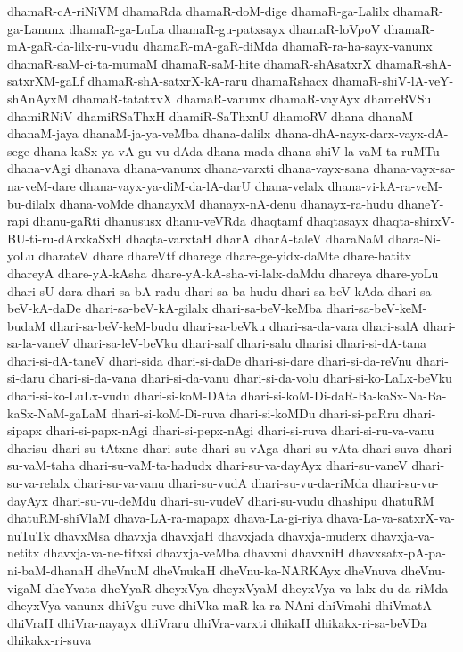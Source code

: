 {dhamaR-cA-riNiVM
dhamaRda
dhamaR-doM-dige
dhamaR-ga-Lalilx
dhamaR-ga-Lanunx
dhamaR-ga-LuLa
dhamaR-gu-patxsayx
dhamaR-loVpoV
dhamaR-mA-gaR-da-lilx-ru-vudu
dhamaR-mA-gaR-diMda
dhamaR-ra-ha-sayx-vanunx
dhamaR-saM-ci-ta-mumaM
dhamaR-saM-hite
dhamaR-shAsatxrX
dhamaR-shA-satxrXM-gaLf
dhamaR-shA-satxrX-kA-raru
dhamaRshacx
dhamaR-shiV-lA-veY-shAnAyxM
dhamaR-tatatxvX
dhamaR-vanunx
dhamaR-vayAyx
dhameRVSu
dhamiRNiV
dhamiRSaThxH
dhamiR-SaThxnU
dhamoRV
dhana
dhanaM
dhanaM-jaya
dhanaM-ja-ya-veMba
dhana-dalilx
dhana-dhA-nayx-darx-vayx-dA-sege
dhana-kaSx-ya-vA-gu-vu-dAda
dhana-mada
dhana-shiV-la-vaM-ta-ruMTu
dhana-vAgi
dhanava
dhana-vanunx
dhana-varxti
dhana-vayx-sana
dhana-vayx-sa-na-veM-dare
dhana-vayx-ya-diM-da-lA-darU
dhana-velalx
dhana-vi-kA-ra-veM-bu-dilalx
dhana-voMde
dhanayxM
dhanayx-nA-denu
dhanayx-ra-hudu
dhaneY-rapi
dhanu-gaRti
dhanususx
dhanu-veVRda
dhaqtamf
dhaqtasayx
dhaqta-shirxV-BU-ti-ru-dArxkaSxH
dhaqta-varxtaH
dharA
dharA-taleV
dharaNaM
dhara-Ni-yoLu
dharateV
dhare
dhareVtf
dharege
dhare-ge-yidx-daMte
dhare-hatitx
dhareyA
dhare-yA-kAsha
dhare-yA-kA-sha-vi-lalx-daMdu
dhareya
dhare-yoLu
dhari-sU-dara
dhari-sa-bA-radu
dhari-sa-ba-hudu
dhari-sa-beV-kAda
dhari-sa-beV-kA-daDe
dhari-sa-beV-kA-gilalx
dhari-sa-beV-keMba
dhari-sa-beV-keM-budaM
dhari-sa-beV-keM-budu
dhari-sa-beVku
dhari-sa-da-vara
dhari-salA
dhari-sa-la-vaneV
dhari-sa-leV-beVku
dhari-salf
dhari-salu
dharisi
dhari-si-dA-tana
dhari-si-dA-taneV
dhari-sida
dhari-si-daDe
dhari-si-dare
dhari-si-da-reVnu
dhari-si-daru
dhari-si-da-vana
dhari-si-da-vanu
dhari-si-da-volu
dhari-si-ko-LaLx-beVku
dhari-si-ko-LuLx-vudu
dhari-si-koM-DAta
dhari-si-koM-Di-daR-Ba-kaSx-Na-Ba-kaSx-NaM-gaLaM
dhari-si-koM-Di-ruva
dhari-si-koMDu
dhari-si-paRru
dhari-sipapx
dhari-si-papx-nAgi
dhari-si-pepx-nAgi
dhari-si-ruva
dhari-si-ru-va-vanu
dharisu
dhari-su-tAtxne
dhari-sute
dhari-su-vAga
dhari-su-vAta
dhari-suva
dhari-su-vaM-taha
dhari-su-vaM-ta-hadudx
dhari-su-va-dayAyx
dhari-su-vaneV
dhari-su-va-relalx
dhari-su-va-vanu
dhari-su-vudA
dhari-su-vu-da-riMda
dhari-su-vu-dayAyx
dhari-su-vu-deMdu
dhari-su-vudeV
dhari-su-vudu
dhashipu
dhatuRM
dhatuRM-shiVlaM
dhava-LA-ra-mapapx
dhava-La-gi-riya
dhava-La-va-satxrX-va-nuTuTx
dhavxMsa
dhavxja
dhavxjaH
dhavxjada
dhavxja-muderx
dhavxja-va-netitx
dhavxja-va-ne-titxsi
dhavxja-veMba
dhavxni
dhavxniH
dhavxsatx-pA-pa-ni-baM-dhanaH
dheVnuM
dheVnukaH
dheVnu-ka-NARKAyx
dheVnuva
dheVnu-vigaM
dheYvata
dheYyaR
dheyxVya
dheyxVyaM
dheyxVya-va-lalx-du-da-riMda
dheyxVya-vanunx
dhiVgu-ruve
dhiVka-maR-ka-ra-NAni
dhiVmahi
dhiVmatA
dhiVraH
dhiVra-nayayx
dhiVraru
dhiVra-varxti
dhikaH
dhikakx-ri-sa-beVDa
dhikakx-ri-suva
}
